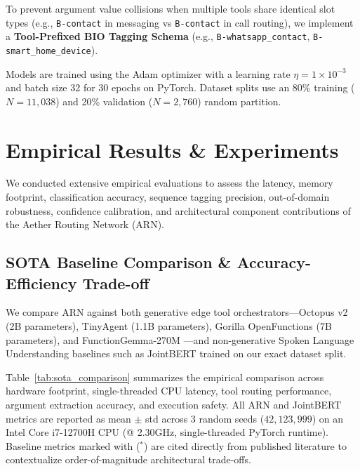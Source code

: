 \documentclass[conference]{IEEEtran}
\begin{document}
To prevent argument value collisions when multiple tools share identical slot types (e.g., \texttt{B-contact} in messaging vs \texttt{B-contact} in call routing), we implement a \textbf{Tool-Prefixed BIO Tagging Schema} (e.g., \texttt{B-whatsapp\_contact}, \texttt{B-smart\_home\_device}).

Models are trained using the Adam optimizer \cite{kingma2014adam} with a learning rate $\eta = 1\times 10^{-3}$ and batch size 32 for 30 epochs on PyTorch. Dataset splits use an 80\% training ($N=11,038$) and 20\% validation ($N=2,760$) random partition.


\section{Empirical Results \& Experiments}

We conducted extensive empirical evaluations to assess the latency, memory footprint, classification accuracy, sequence tagging precision, out-of-domain robustness, confidence calibration, and architectural component contributions of the Aether Routing Network (ARN).

\subsection{SOTA Baseline Comparison \& Accuracy-Efficiency Trade-off}
We compare ARN against both generative edge tool orchestrators---Octopus v2 \cite{chen2024octopus} (2B parameters), TinyAgent \cite{erdogan2024tinyagent} (1.1B parameters), Gorilla OpenFunctions \cite{patil2023gorilla} (7B parameters), and FunctionGemma-270M \cite{google2025functiongemma}---and non-generative Spoken Language Understanding baselines such as JointBERT \cite{chen2019bert} trained on our exact dataset split.

Table~\ref{tab:sota_comparison} summarizes the empirical comparison across hardware footprint, single-threaded CPU latency, tool routing performance, argument extraction accuracy, and execution safety. All ARN and JointBERT metrics are reported as mean $\pm$ std across 3 random seeds ($42, 123, 999$) on an Intel Core i7-12700H CPU (@ 2.30GHz, single-threaded PyTorch runtime). Baseline metrics marked with ($^*$) are cited directly from published literature to contextualize order-of-magnitude architectural trade-offs.
\end{document}
